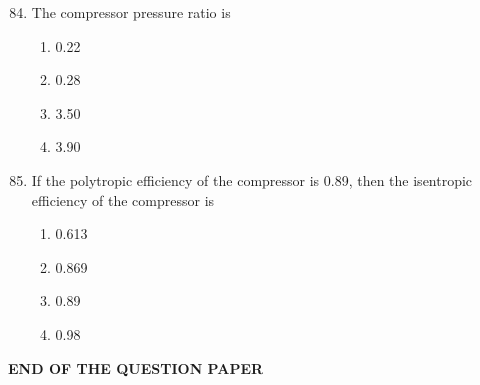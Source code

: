 \documentclass{article}
\begin{document}
\begin{enumerate}
    \setcounter{enumi}{83}
    \item The compressor pressure ratio is
    \begin{multicols}{4}
    \begin{enumerate}
        \item 0.22
        \item 0.28
        \item 3.50
        \item 3.90
    \end{enumerate}
    \end{multicols}
    

    \item If the polytropic efficiency of the compressor is 0.89, then the isentropic efficiency of the compressor is
    \begin{multicols}{4}
    \begin{enumerate}
        \item 0.613
        \item 0.869
        \item 0.89
        \item 0.98
    \end{enumerate}
    \end{multicols}
\end{enumerate}

\begin{center}
{\Large \textbf{END OF THE QUESTION PAPER}}
\end{center}
\end{document}
